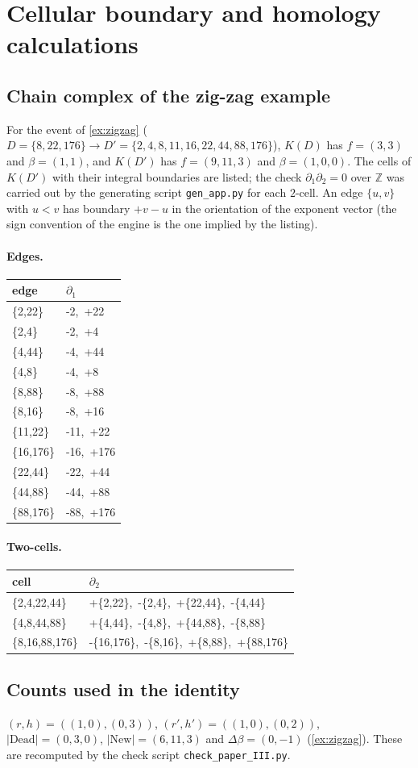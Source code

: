 \section{Cellular boundary and homology calculations}\label{app:homology}
\subsection{Chain complex of the zig-zag example}
For the event of \cref{ex:zigzag} ($D=\{8,22,176\}\to D'=\{2,4,8,11,16,22,44,88,176\}$), $K(D)$ has $f=(3,3)$ and $\beta=(1,1)$, and $K(D')$ has $f=(9,11,3)$ and $\beta=(1,0,0)$. The cells of $K(D')$ with their integral boundaries are listed; the check $\partial_1\partial_2=0$ over $\mathbb Z$ was carried out by the generating script \texttt{gen\_app.py} for each $2$-cell. An edge $\{u,v\}$ with $u<v$ has boundary $+v-u$ in the orientation of the exponent vector (the sign convention of the engine is the one implied by the listing).
\paragraph{Edges.}\begin{center}\small\begin{tabular}{@{}ll@{}}\toprule
edge & $\partial_1$\\\midrule
\{2,22\} & -2,\ +22\\
\{2,4\} & -2,\ +4\\
\{4,44\} & -4,\ +44\\
\{4,8\} & -4,\ +8\\
\{8,88\} & -8,\ +88\\
\{8,16\} & -8,\ +16\\
\{11,22\} & -11,\ +22\\
\{16,176\} & -16,\ +176\\
\{22,44\} & -22,\ +44\\
\{44,88\} & -44,\ +88\\
\{88,176\} & -88,\ +176\\
\bottomrule\end{tabular}\end{center}
\paragraph{Two-cells.}\begin{center}\small\begin{tabular}{@{}ll@{}}\toprule
cell & $\partial_2$\\\midrule
\{2,4,22,44\} & +\{2,22\},\ -\{2,4\},\ +\{22,44\},\ -\{4,44\}\\
\{4,8,44,88\} & +\{4,44\},\ -\{4,8\},\ +\{44,88\},\ -\{8,88\}\\
\{8,16,88,176\} & -\{16,176\},\ -\{8,16\},\ +\{8,88\},\ +\{88,176\}\\
\bottomrule\end{tabular}\end{center}
\subsection{Counts used in the identity}
$(r,h)=((1,0),(0,3))$, $(r',h')=((1,0),(0,2))$, $|\mathrm{Dead}|=(0,3,0)$, $|\mathrm{New}|=(6,11,3)$ and $\Delta\beta=(0,-1)$ (\cref{ex:zigzag}). These are recomputed by the check script \texttt{check\_paper\_III.py}.
